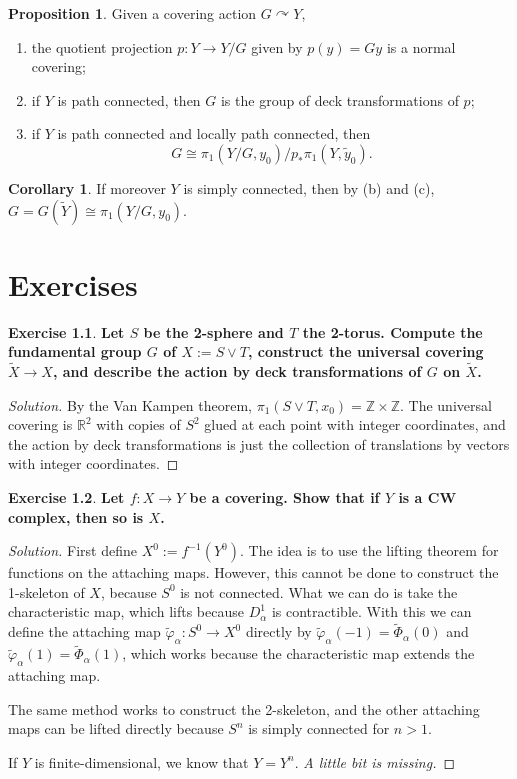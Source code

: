 \documentclass{book}
\theoremstyle{definition}
\newtheorem*{prop}{Proposition}
\newtheorem*{coro}{Corollary}
\newtheorem*{ejer}{Exercise}
\newcommand{\R}{\mathbb{R}}
\newcommand{\Z}{\mathbb{Z}}
\begin{document}
\begin{prop}
Given a covering action $G\curvearrowright Y$,
\begin{enumerate}
\item the quotient projection $p:Y\to Y/G$ given by
$p(y)=Gy$ is a normal covering;
\item if $Y$ is path connected, then $G$ is the group of deck
transformations of $p$;
\item if $Y$ is path connected and locally path connected,
then
$$
G\cong\pi_1(Y/G,y_0)/p_*\pi_1(Y,\tilde y_0).
$$
\end{enumerate}
\end{prop}

\begin{coro}
If moreover $Y$ is simply connected, then by (b) and (c),
$G=G(\tilde Y)\cong\pi_1(Y/G,y_0)$.
\end{coro}

\chapter{Exercises}

\begin{ejer}
\textbf{Let $S$ be the 2-sphere and $T$ the 2-torus. Compute
the fundamental group $G$ of $X:=S\vee T$, construct the
universal covering $\widetilde X\to X$, and describe the
action by deck transformations of $G$ on $\widetilde X$.}
\begin{proof}[Solution]
By the Van Kampen theorem,
$\pi_1(S\vee T,x_0)=\Z\times\Z$. The universal covering is
$\R^2$ with copies of $S^2$ glued at each point with integer
coordinates, and the action by deck transformations is just
the collection of translations by vectors with integer
coordinates.
\end{proof}
\end{ejer}

\begin{ejer}
\textbf{Let $f:X\to Y$ be a covering. Show that if $Y$ is a
CW complex, then so is $X$.}
\end{ejer}

\begin{proof}[Solution]
First define $X^0:=f^{-1}(Y^0)$. The idea is to use the
lifting theorem for functions on the attaching maps.
However, this cannot be done to construct the 1-skeleton of
$X$, because $S^0$ is not connected. What we can do is take
the characteristic map, which lifts because $D^1_\alpha$ is
contractible. With this we can define the attaching map
$\tilde\varphi_\alpha:S^0\to X^0$ directly by
$\tilde\varphi_\alpha(-1)=\tilde\Phi_\alpha(0)$ and
$\tilde\varphi_\alpha(1)=\tilde\Phi_\alpha(1)$, which works
because the characteristic map extends the attaching map.

The same method works to construct the 2-skeleton, and the
other attaching maps can be lifted directly because $S^n$ is
simply connected for $n>1$.

If $Y$ is finite-dimensional, we know that $Y=Y^n$.
\textit{A little bit is missing.}
\end{proof}
\end{document}
